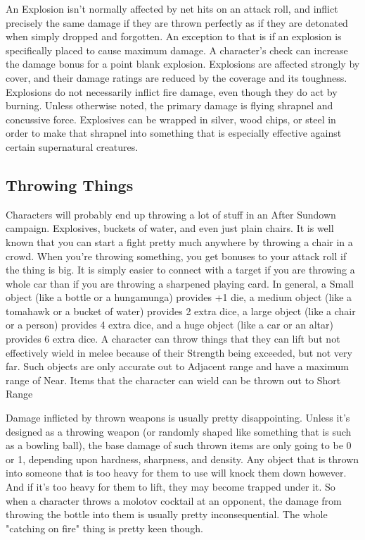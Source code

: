 An Explosion isn't normally affected by net hits on an attack roll, and inflict precisely the same damage if they are thrown perfectly as if they are detonated when simply dropped and forgotten. An exception to that is if an explosion is specifically placed to cause maximum damage. A character's  check can increase the damage bonus for a point blank explosion. Explosions are affected strongly by cover, and their damage ratings are reduced by the coverage and its toughness. Explosions do not necessarily inflict fire damage, even though they do act by burning. Unless otherwise noted, the primary damage is flying shrapnel and concussive force. Explosives can be wrapped in silver, wood chips, or steel in order to make that shrapnel into something that is especially effective against certain supernatural creatures.

\subsection{Throwing Things} 

Characters will probably end up throwing a lot of stuff in an After Sundown campaign. Explosives, buckets of water, and even just plain chairs. It is well known that you can start a fight pretty much anywhere by throwing a chair in a crowd. When you're throwing something, you get bonuses to your attack roll if the thing is big. It is simply easier to connect with a target if you are throwing a whole car than if you are throwing a sharpened playing card. In general, a Small object (like a bottle or a hungamunga) provides +1 die, a medium object (like a tomahawk or a bucket of water) provides 2 extra dice, a large object (like a chair or a person) provides 4 extra dice, and a huge object (like a car or an altar) provides 6 extra dice. A character can throw things that they can lift but not effectively wield in melee because of their Strength being exceeded, but not very far. Such objects are only accurate out to Adjacent range and have a maximum range of Near. Items that the character can wield can be thrown out to Short Range

Damage inflicted by thrown weapons is usually pretty disappointing. Unless it's designed as a throwing weapon (or randomly shaped like something that is such as a bowling ball), the base damage of such thrown items are only going to be 0 or 1, depending upon hardness, sharpness, and density. Any object that is thrown into someone that is too heavy for them to use will knock them down however. And if it's too heavy for them to lift, they may become trapped under it. So when a character throws a molotov cocktail at an opponent, the damage from throwing the bottle into them is usually pretty inconsequential. The whole "catching on fire" thing is pretty keen though.

